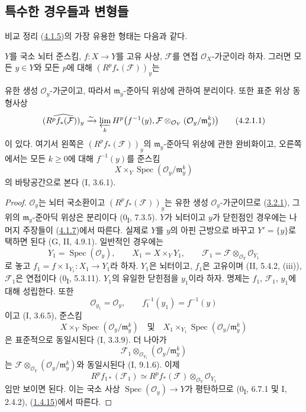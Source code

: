 \subsection{특수한 경우들과 변형들}
\label{subsection:III.4.2-fr}

비교 정리 (\hyperref[III.4.1.5-fr]{4.1.5})의 가장 유용한 형태는
다음과 같다.

\begin{proposition}[4.2.1]
\label{III.4.2.1-fr}
$Y$를 국소 뇌터 준스킴, $f:X\to Y$를 고유 사상, $\mathcal F$를 연접
$\mathcal O_X$-가군이라 하자. 그러면 모든 $y\in Y$와 모든 $p$에 대해
$(R^pf_*(\mathcal F))_y$는


유한 생성 $\mathcal O_y$-가군이고, 따라서 $\mathfrak m_y$-준아딕
위상에 관하여 분리이다. 또한 표준 위상 동형사상
\[
\widehat{(R^pf_*(\mathcal F))_y}
\xrightarrow{\sim}
\varprojlim_kH^p\bigl(f^{-1}(y),
\mathcal F\otimes_{\mathcal O_Y}(\mathcal O_y/\mathfrak m_y^k)\bigr)
\tag{4.2.1.1}\label{III.4.2.1.1-fr}
\]
이 있다. 여기서 왼쪽은 $(R^pf_*(\mathcal F))_y$의
$\mathfrak m_y$-준아딕 위상에 관한 완비화이고, 오른쪽에서는 모든
$k\geq0$에 대해 $f^{-1}(y)$를 준스킴
\[
X\times_Y\operatorname{Spec}(\mathcal O_y/\mathfrak m_y^k)
\]
의 바탕공간으로 본다 (I, 3.6.1).
\end{proposition}

\begin{proof}
$\mathcal O_y$는 뇌터 국소환이고
$(R^pf_*(\mathcal F))_y$는 유한 생성 $\mathcal O_y$-가군이므로
(\hyperref[III.3.2.1-fr]{3.2.1}), 그 위의
$\mathfrak m_y$-준아딕 위상은 분리이다 (0\textsubscript{I}, 7.3.5).
$Y$가 뇌터이고 $y$가 닫힌점인 경우에는 나머지 주장들이
(\hyperref[III.4.1.7-fr]{4.1.7})에서 따른다. 실제로 $Y$를 $y$의
아핀 근방으로 바꾸고 $Y'=\{y\}$로 택하면 된다
(G, II, 4.9.1). 일반적인 경우에는
\[
Y_1=\operatorname{Spec}(\mathcal O_y),\qquad
X_1=X\times_YY_1,\qquad
\mathcal F_1=\mathcal F\otimes_{\mathcal O_Y}\mathcal O_{Y_1}
\]
로 놓고 $f_1=f\times1_{Y_1}:X_1\to Y_1$라 하자. $Y_1$은 뇌터이고,
$f_1$은 고유이며 (II, 5.4.2, (iii)), $\mathcal F_1$은 연접이다
(0\textsubscript{I}, 5.3.11). $Y_1$의 유일한 닫힌점을 $y_1$이라 하자.
명제는 $f_1$, $\mathcal F_1$, $y_1$에 대해 성립한다. 또한
\[
\mathcal O_{y_1}=\mathcal O_y,\qquad
f_1^{-1}(y_1)=f^{-1}(y)
\]
이고 (I, 3.6.5), 준스킴
\[
X\times_Y\operatorname{Spec}(\mathcal O_y/\mathfrak m_y^k)
\quad\text{및}\quad
X_1\times_{Y_1}\operatorname{Spec}(\mathcal O_y/\mathfrak m_y^k)
\]
은 표준적으로 동일시된다 (I, 3.3.9). 더 나아가
\[
\mathcal F_1\otimes_{\mathcal O_{Y_1}}
(\mathcal O_y/\mathfrak m_y^k)
\]
는
$\mathcal F\otimes_{\mathcal O_Y}(\mathcal O_y/\mathfrak m_y^k)$와
동일시된다 (I, 9.1.6). 이제
\[
R^pf_{1*}(\mathcal F_1)\simeq
R^pf_*(\mathcal F)\otimes_{\mathcal O_Y}\mathcal O_{Y_1}
\]
임만 보이면 된다. 이는 국소 사상
$\operatorname{Spec}(\mathcal O_y)\to Y$가 평탄하므로
(0\textsubscript{I}, 6.7.1 및 I, 2.4.2),
(\hyperref[III.1.4.15-fr]{1.4.15})에서 따른다.
\end{proof}

